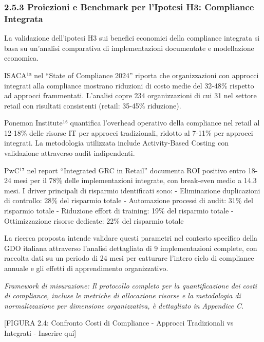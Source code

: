\documentclass[12pt,a4paper,oneside]{book}
\begin{document}
\subsubsection{2.5.3 Proiezioni e Benchmark per l'Ipotesi H3: Compliance
Integrata}\label{proiezioni-e-benchmark-per-lipotesi-h3-compliance-integrata}

La validazione dell'ipotesi H3 sui benefici economici della compliance
integrata si basa su un'analisi comparativa di implementazioni
documentate e modellazione economica.

ISACA¹⁵ nel ``State of Compliance 2024'' riporta che organizzazioni con
approcci integrati alla compliance mostrano riduzioni di costo medie del
32-48\% rispetto ad approcci frammentati. L'analisi copre 234
organizzazioni di cui 31 nel settore retail con risultati consistenti
(retail: 35-45\% riduzione).

Ponemon Institute¹⁶ quantifica l'overhead operativo della compliance nel
retail al 12-18\% delle risorse IT per approcci tradizionali, ridotto al
7-11\% per approcci integrati. La metodologia utilizzata include
Activity-Based Costing con validazione attraverso audit indipendenti.

PwC¹⁷ nel report ``Integrated GRC in Retail'' documenta ROI positivo
entro 18-24 mesi per il 78\% delle implementazioni integrate, con
break-even medio a 14.3 mesi. I driver principali di risparmio
identificati sono: - Eliminazione duplicazioni di controllo: 28\% del
risparmio totale - Automazione processi di audit: 31\% del risparmio
totale - Riduzione effort di training: 19\% del risparmio totale -
Ottimizzazione risorse dedicate: 22\% del risparmio totale

La ricerca proposta intende validare questi parametri nel contesto
specifico della GDO italiana attraverso l'analisi dettagliata di 9
implementazioni complete, con raccolta dati su un periodo di 24 mesi per
catturare l'intero ciclo di compliance annuale e gli effetti di
apprendimento organizzativo.

\emph{Framework di misurazione: Il protocollo completo per la
quantificazione dei costi di compliance, incluse le metriche di
allocazione risorse e la metodologia di normalizzazione per dimensione
organizzativa, è dettagliato in Appendice C.}

{[}FIGURA 2.4: Confronto Costi di Compliance - Approcci Tradizionali vs
Integrati - Inserire qui{]}
\end{document}
